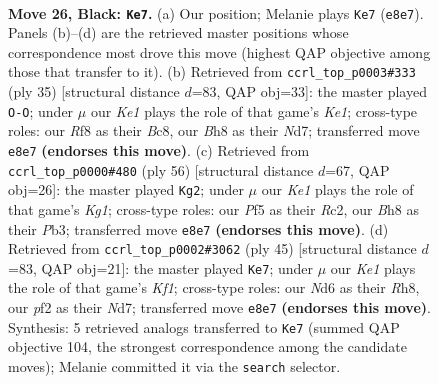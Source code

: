 \documentclass[11pt]{article}
\begin{document}
\clearpage

\begin{figure}[p]\centering
\begin{subfigure}{0.46\textwidth}\centering
\resizebox{\linewidth}{!}{%
\newchessgame
\chessboard[
  setfen={r3kr1b/1ppb4/p2n4/4pp2/7R/PBN2N2/1P2KPP1/R1B5 b - - 4 26},
  showmover=false,
  pgfstyle=straightmove, color=movearrow, markmove={e8-e7}
]}
\caption{}
\end{subfigure}\hfill
\begin{subfigure}{0.46\textwidth}\centering
\resizebox{\linewidth}{!}{%
\newchessgame
\chessboard[
  setfen={1rb1k2r/3nbpp1/p3p2p/1p6/4BP2/PNNR4/1PP3PP/1K5R b k - 2 18},
  showmover=false,
  pgfstyle=straightmove, color=movearrow, markmove={e8-g8}
]}
\caption{}
\end{subfigure}
\\[4pt]
\begin{subfigure}{0.46\textwidth}\centering
\resizebox{\linewidth}{!}{%
\newchessgame
\chessboard[
  setfen={r4bk1/1n2pp2/5np1/3P3p/1r6/1PN1B1PP/B1R2P2/2R3K1 w - - 0 29},
  showmover=false,
  pgfstyle=straightmove, color=movearrow, markmove={g1-g2}
]}
\caption{}
\end{subfigure}\hfill
\begin{subfigure}{0.46\textwidth}\centering
\resizebox{\linewidth}{!}{%
\newchessgame
\chessboard[
  setfen={1r3k1r/3n2pp/4pb2/2pb4/7P/P3BN2/4BPP1/2R1K2R b K - 1 23},
  showmover=false,
  pgfstyle=straightmove, color=movearrow, markmove={f8-e7}
]}
\caption{}
\end{subfigure}
\caption{\textbf{Move 26, Black: \texttt{Ke7}.} (a) Our position; Melanie plays \texttt{Ke7} (\texttt{e8e7}). Panels (b)--(d) are the retrieved master positions whose correspondence most drove this move (highest QAP objective among those that transfer to it). (b) Retrieved from \texttt{ccrl\_top\_p0003\#333} (ply 35) [structural distance $d$=83, QAP obj=33]: the master played \texttt{O-O}; under $\mu$ our \emph{Ke1} plays the role of that game's \emph{Ke1}; cross-type roles: our \emph{R}f8 as their \emph{B}c8, our \emph{B}h8 as their \emph{N}d7; transferred move \texttt{e8e7} \textbf{(endorses this move)}. (c) Retrieved from \texttt{ccrl\_top\_p0000\#480} (ply 56) [structural distance $d$=67, QAP obj=26]: the master played \texttt{Kg2}; under $\mu$ our \emph{Ke1} plays the role of that game's \emph{Kg1}; cross-type roles: our \emph{P}f5 as their \emph{R}c2, our \emph{B}h8 as their \emph{P}b3; transferred move \texttt{e8e7} \textbf{(endorses this move)}. (d) Retrieved from \texttt{ccrl\_top\_p0002\#3062} (ply 45) [structural distance $d$=83, QAP obj=21]: the master played \texttt{Ke7}; under $\mu$ our \emph{Ke1} plays the role of that game's \emph{Kf1}; cross-type roles: our \emph{N}d6 as their \emph{R}h8, our \emph{p}f2 as their \emph{N}d7; transferred move \texttt{e8e7} \textbf{(endorses this move)}. Synthesis: 5 retrieved analogs transferred to \texttt{Ke7} (summed QAP objective 104, the strongest correspondence among the candidate moves); Melanie committed it via the \texttt{search} selector.}
\label{fig:thought-m51}
\end{figure}
\end{document}

